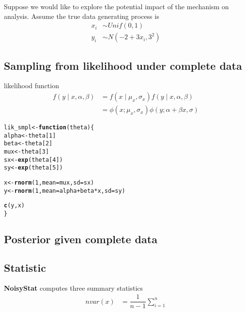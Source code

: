 \documentclass{article}\usepackage[]{graphicx}\usepackage[]{xcolor}
\makeatletter
\newcommand{\hlnum}[1]{\textcolor[rgb]{0.686,0.059,0.569}{#1}}%
\newcommand{\hlopt}[1]{\textcolor[rgb]{0,0,0}{#1}}%
\newcommand{\hlstd}[1]{\textcolor[rgb]{0.345,0.345,0.345}{#1}}%
\newcommand{\hlkwa}[1]{\textcolor[rgb]{0.161,0.373,0.58}{\textbf{#1}}}%
\newcommand{\hlkwb}[1]{\textcolor[rgb]{0.69,0.353,0.396}{#1}}%
\newcommand{\hlkwc}[1]{\textcolor[rgb]{0.333,0.667,0.333}{#1}}%
\newcommand{\hlkwd}[1]{\textcolor[rgb]{0.737,0.353,0.396}{\textbf{#1}}}%
\newenvironment{kframe}{%
 \def\at@end@of@kframe{}%
 \ifinner\ifhmode%
  \def\at@end@of@kframe{\end{minipage}}%
  \begin{minipage}{\columnwidth}%
 \fi\fi%
 \def\FrameCommand##1{\hskip\@totalleftmargin \hskip-\fboxsep
 \colorbox{shadecolor}{##1}\hskip-\fboxsep
     \hskip-\linewidth \hskip-\@totalleftmargin \hskip\columnwidth}%
 \MakeFramed {\advance\hsize-\width
   \@totalleftmargin\z@ \linewidth\hsize
   \@setminipage}}%
 {\par\unskip\endMakeFramed%
 \at@end@of@kframe}
\newenvironment{knitrout}{}{} %
\theoremstyle{definition}
\makeatother
\begin{document}
Suppose we would like to explore the potential impact 
of the  mechanism on analysis. Assume
the true data generating process is 
\begin{align*}
x_i &\sim Unif(0,1)\\
y_i &\sim N(-2 + 3 x_i, 3^2)
\end{align*}

\subsection*{Sampling from likelihood under complete data}
likelihood function
\begin{align*}
f(y \mid x,  \alpha, \beta) 
&= f(x \mid \mu_x, \sigma_x)f(y \mid x, \alpha, \beta)\\
&= \phi(x; \mu_x, \sigma_x)\phi(y; \alpha + \beta x, \sigma)
\end{align*}

\begin{knitrout}
\color{fgcolor}\begin{kframe}
\begin{alltt}
\hlstd{lik_smpl} \hlkwb{<-} \hlkwa{function}\hlstd{(}\hlkwc{theta}\hlstd{) \{}
  \hlstd{alpha} \hlkwb{<-} \hlstd{theta[}\hlnum{1}\hlstd{]}
  \hlstd{beta} \hlkwb{<-} \hlstd{theta[}\hlnum{2}\hlstd{]}
  \hlstd{mux} \hlkwb{<-} \hlstd{theta[}\hlnum{3}\hlstd{]}
  \hlstd{sx} \hlkwb{<-} \hlkwd{exp}\hlstd{(theta[}\hlnum{4}\hlstd{])}
  \hlstd{sy} \hlkwb{<-} \hlkwd{exp}\hlstd{(theta[}\hlnum{5}\hlstd{])}

  \hlstd{x} \hlkwb{<-} \hlkwd{rnorm}\hlstd{(}\hlnum{1}\hlstd{,} \hlkwc{mean} \hlstd{= mux,} \hlkwc{sd} \hlstd{= sx)}
  \hlstd{y} \hlkwb{<-} \hlkwd{rnorm}\hlstd{(}\hlnum{1}\hlstd{,} \hlkwc{mean} \hlstd{= alpha} \hlopt{+} \hlstd{beta} \hlopt{*} \hlstd{x,} \hlkwc{sd} \hlstd{= sy)}

  \hlkwd{c}\hlstd{(y,x)}
\hlstd{\}}
\end{alltt}
\end{kframe}
\end{knitrout}

\subsection*{Posterior given complete data}


\subsection*{Statistic}
\textbf{NoisyStat} computes three summary statistics
\begin{align*}
nvar(x) &= \dfrac{1}{n-1}\sum_{i=1}^{n}
\end{align*}
\end{document}
